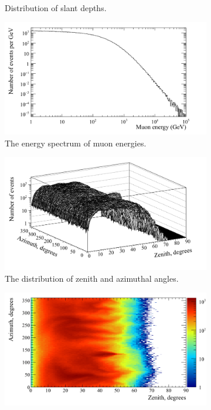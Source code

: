 \begin{figure}[h!]
\begin{subfigure}{0.45\textwidth}
    \caption{Distribution of slant depths.}
  \end{subfigure}
  \hspace{0.08\textwidth}
  \begin{subfigure}{0.45\textwidth}
    \centering
    \includegraphics[width=\textwidth]{EnergyPerGeVCan}
    \caption{The energy spectrum of muon energies.}
  \end{subfigure}
  \begin{subfigure}{0.45\textwidth}
    \centering
    \includegraphics[width=\textwidth]{AziZenCan}
    \caption{The distribution of zenith and azimuthal angles.}
  \end{subfigure}
  \hspace{0.08\textwidth}
  \begin{subfigure}{0.45\textwidth}
    \centering
    \includegraphics[width=\textwidth]{AziZenColzCan}

\end{subfigure}
\end{figure}
